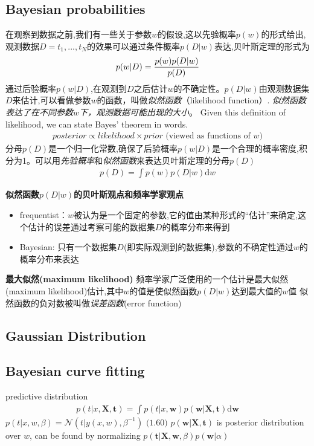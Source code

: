 \documentclass[a4paper]{article}
\begin{document}
\subsection{Bayesian probabilities}
在观察到数据之前,我们有一些关于参数$w$的假设,这以先验概率$p(w)$的形式给出,观测数据$D = {t_1,...,t_N}$的效果可以通过条件概率$p(D|w)$表达,贝叶斯定理的形式为
\begin{align}
  p(w|D) = { p(w)p(D|w) \over p(D) }
\end{align}
通过后验概率$p(w|D)$,在观测到$D$之后估计$w$的不确定性。$p(D|w)$由观测数据集$D$来估计,可以看做参数$w$的函数，叫做\textit{似然函数}（likelihood function）.
\emph{似然函数表达了在不同参数$w$下，观测数据可能出现的大小}。
Given this definition of likelihood, we can state Bayes' theorem in words.
\begin{align}
  posterior \propto likelihood \times prior \text{ (viewed as functions of $w$)}
\end{align}
分母$p(D)$是一个归一化常数,确保了后验概率$p(w|D)$是一个合理的概率密度,积分为1。可以用\emph{先验概率}和\emph{似然函数}来表达贝叶斯定理的分母$p(D)$
\begin{align}
  p(D) = \int p(w) p(D|w) \mathrm{d} w
\end{align}

\textbf{似然函数$p(D|w)$的贝叶斯观点和频率学家观点}
\begin{itemize}
\item frequentist：$w$被认为是一个固定的参数,它的值由某种形式的“估计”来确定,这个估计的误差通过考察可能的数据集$D$的概率分布来得到
\item Bayesian: 只有一个数据集$D$(即实际观测到的数据集),参数的不确定性通过$w$的概率分布来表达
\end{itemize}

\textbf{最大似然(maximum likelihood)}
频率学家广泛使用的一个估计是最大似然(maximum likelihood)估计,其中$w$的值是使似然函数$p(D|w)$达到最大值的$w$值
似然函数的负对数被叫做\emph{误差函数}(error function)

\subsection{Gaussian Distribution}

\subsection{Bayesian curve fitting}
\label{sec:1.2.6}

predictive distribution
\begin{align}
  p(t|x, \mathbf{X}, \mathbf{t}) = \int p(t|x,\mathbf{w}) p(\mathbf{w}|\mathbf{X},\mathbf{t}) \mathrm{d} \mathbf{w}
\end{align}
$p(t|x, w, \beta) = \mathcal{N}(t|y(x,w), \beta^{-1}) \text{ (1.60)}$
$p(\mathbf{w}|\mathbf{X},\mathbf{t})$ is posterior distribution over $w$, can be found by normalizing $p(\mathbf{t}|\mathbf{X},\mathbf{w},\beta)p(\mathbf{w}|\alpha)$
\end{document}
